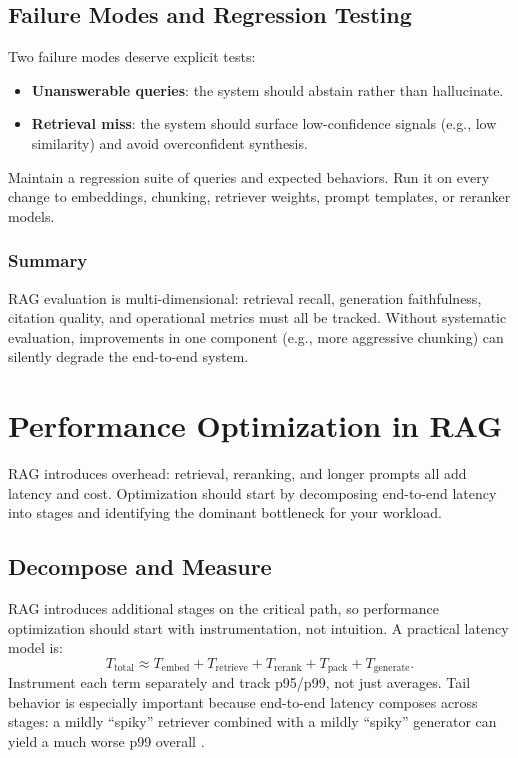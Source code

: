 \subsection{Failure Modes and Regression Testing}
Two failure modes deserve explicit tests:
\begin{itemize}
    \item \textbf{Unanswerable queries}: the system should abstain rather than hallucinate.
    \item \textbf{Retrieval miss}: the system should surface low-confidence signals (e.g., low similarity) and avoid overconfident synthesis.
\end{itemize}
Maintain a regression suite of queries and expected behaviors. Run it on every change to embeddings, chunking, retriever weights, prompt templates, or reranker models.

\subsubsection*{Summary}
RAG evaluation is multi-dimensional: retrieval recall, generation faithfulness, citation quality, and operational metrics must all be tracked. Without systematic evaluation, improvements in one component (e.g., more aggressive chunking) can silently degrade the end-to-end system.

\section{Performance Optimization in RAG}
\label{sec:rag-performance-optimization-in-rag}
RAG introduces overhead: retrieval, reranking, and longer prompts all add latency and cost. Optimization should start by decomposing end-to-end latency into stages and identifying the dominant bottleneck for your workload.

\subsection{Decompose and Measure}
RAG introduces additional stages on the critical path, so performance optimization should start with instrumentation, not intuition. A practical latency model is:
\[
T_{\text{total}} \approx T_{\text{embed}} + T_{\text{retrieve}} + T_{\text{rerank}} + T_{\text{pack}} + T_{\text{generate}}.
\]
Instrument each term separately and track p95/p99, not just averages. Tail behavior is especially important because end-to-end latency composes across stages: a mildly ``spiky'' retriever combined with a mildly ``spiky'' generator can yield a much worse p99 overall \cite{Dean2013TailAtScale}.

